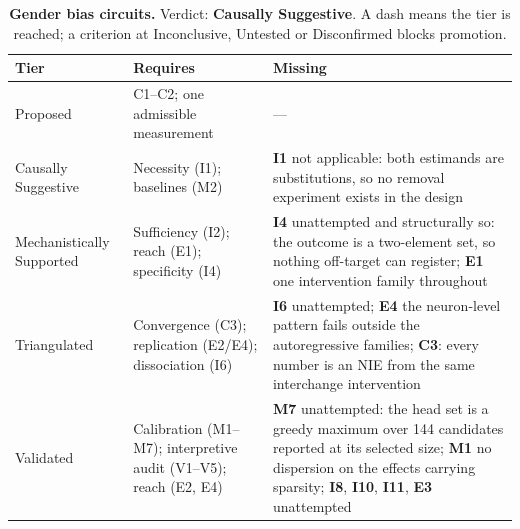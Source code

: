 \begin{table}[H]
\centering
\footnotesize
\caption{\textbf{Gender bias circuits.} Verdict: \textbf{Causally Suggestive}. A dash means the tier is reached; a criterion at
Inconclusive, Untested or Disconfirmed blocks promotion.}
\label{tab:gender-verdict}
\renewcommand{\arraystretch}{1.18}
\begin{tabular}{@{}l>{\raggedright\arraybackslash}p{3.6cm}>{\raggedright\arraybackslash}p{4.4cm}@{}}
\toprule
\textbf{Tier} & \textbf{Requires} & \textbf{Missing} \\
\midrule
Proposed & C1--C2; one admissible measurement & --- \\
\addlinespace[2pt]
Causally Suggestive & Necessity (I1); baselines (M2) & \textbf{I1} not applicable: both estimands are substitutions, so no removal experiment exists in the design \\
\addlinespace[2pt]
Mechanistically Supported & Sufficiency (I2); reach (E1); specificity (I4) & \textbf{I4} unattempted and structurally so: the outcome is a two-element set, so nothing off-target can register; \textbf{E1} one intervention family throughout \\
\addlinespace[2pt]
Triangulated & Convergence (C3); replication (E2/E4); dissociation (I6) & \textbf{I6} unattempted; \textbf{E4} the neuron-level pattern fails outside the autoregressive families; \textbf{C3}: every number is an NIE from the same interchange intervention \\
\addlinespace[2pt]
Validated & Calibration (M1--M7); interpretive audit (V1--V5); reach (E2, E4) & \textbf{M7} unattempted: the head set is a greedy maximum over 144 candidates reported at its selected size; \textbf{M1} no dispersion on the effects carrying sparsity; \textbf{I8}, \textbf{I10}, \textbf{I11}, \textbf{E3} unattempted \\
\bottomrule
\end{tabular}
\end{table}

